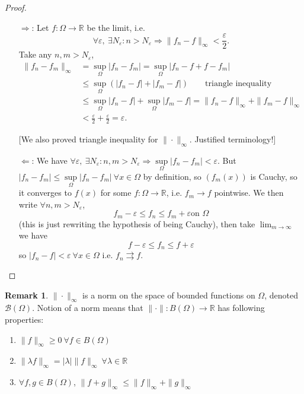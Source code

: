 \documentclass[a4paper]{article}
\theoremstyle{definition}
\newtheorem*{remark}{Remark}
\begin{document}
\begin{proof}
\begin{itemize}
    \item[$\Rightarrow$:] Let $f:\Omega \rightarrow \mathbb R$ be the limit, i.e.
\[
\forall \varepsilon, \ \exists N_\varepsilon : n>N_\varepsilon \Rightarrow \|f_n-f\|_\infty < \frac{\varepsilon}{2} .
\]
Take any $n,m>N_\varepsilon$,
\[
\begin{aligned}\|f_n-f_m\|_\infty &= \underset{\Omega}{\sup} |f_n-f_m| =\underset{\Omega}{\sup} |f_n-f+f-f_m|\\&\leq \underset{\Omega}{\sup} (|f_n-f|+|f_m-f|) \qquad \text{triangle inequality} \\&\leq \underset{\Omega}{\sup}|f_n-f|+\underset{\Omega}{\sup}|f_m-f|=\|f_n-f\|_\infty+\|f_m-f\|_\infty \\&<\frac{\varepsilon}{2}+\frac{\varepsilon}{2}=\varepsilon .\end{aligned}
\]
    
    [We also proved triangle inequality for $\|\cdot \|_\infty$. Justified terminology!]
    \item[$\Leftarrow$:] We have $\forall \varepsilon, \ \exists N_\varepsilon : n,m>N_\varepsilon \Rightarrow \underset{\Omega}{\sup} |f_n-f_m|<\varepsilon .$ But $|f_n-f_m|\leq \underset{\Omega}{\sup} |f_n-f_m| \ \forall x\in \Omega$ by definition, so $(f_m(x))$ is Cauchy, so it converges to $f(x)$ for some $f:\Omega \rightarrow \mathbb R$, i.e. $f_m\rightarrow f$ pointwise. We then write $\forall n,m >N_\varepsilon$,
\[
f_m-\varepsilon \leq f_n \leq f_m+\varepsilon \text{on }\Omega
\]
(this is just rewriting the hypothesis of being Cauchy), then take $\lim_{m\rightarrow \infty}$ we have
\[
f-\varepsilon \leq f_n \leq f+\varepsilon
\]
so $|f_n-f|<\varepsilon \ \forall x\in \Omega$ i.e. $f_n\rightrightarrows f$.
\end{itemize}
\end{proof}

\begin{remark}
$\|\cdot\|_\infty$ is a norm on the space of bounded functions on $\Omega$, denoted $\mathcal B(\Omega)$. Notion of a norm means that $\|\cdot\|:B(\Omega)\rightarrow \mathbb R$ has following properties:
\begin{enumerate}
    \item $\|f\|_\infty \geq 0 \ \forall f\in B(\Omega)$
    \item $\|\lambda f\|_\infty = |\lambda|\|f\|_\infty \ \forall \lambda \in \mathbb R$
    \item $\forall f,g\in B(\Omega)$, $\|f+g\|_\infty \leq \|f\|_\infty+\|g\|_\infty$
\end{enumerate}
\end{remark}
\end{document}
